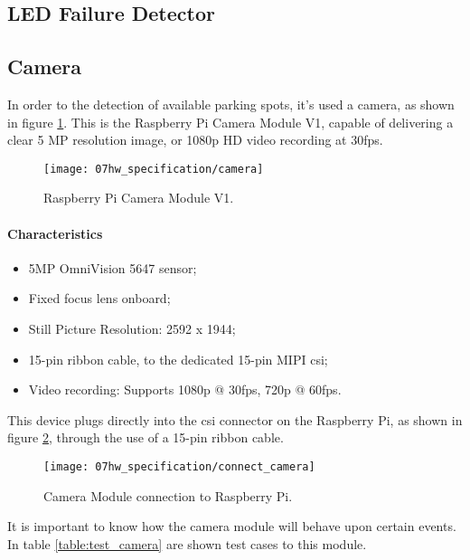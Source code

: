 \subsection{LED Failure Detector}

\subsection{Camera}
In order to the detection of available parking spots, it's used a camera, as shown in figure \ref{fig:camera}. This is the Raspberry Pi Camera Module V1, capable of delivering a clear 5 MP resolution image, or 1080p HD video recording at 30fps. \cite{camera}

\begin{figure}[H]
	\centering
	\texttt{[image: 07hw\_specification/camera]}
	\caption{Raspberry Pi Camera Module V1.}
	\label{fig:camera}
\end{figure}

\paragraph*{Characteristics}
\begin{itemize}
	\item 5MP OmniVision 5647 sensor;
	\item Fixed focus lens onboard;
	\item Still Picture Resolution: 2592 x 1944;
	\item 15-pin ribbon cable, to the dedicated 15-pin MIPI \ac{csi};
	\item Video recording: Supports 1080p @ 30fps, 720p @ 60fps.
\end{itemize}

\clearpage
{}
This device plugs directly into the \ac{csi} connector on the Raspberry Pi, as shown in figure \ref{fig:connect_camera}, through the use of a 15-pin ribbon cable.

\begin{figure}[ht]
	\centering
	\texttt{[image: 07hw\_specification/connect\_camera]}
	\caption{Camera Module connection to Raspberry Pi.}
	\label{fig:connect_camera}
\end{figure}

It is important to know how the camera module will behave upon certain events. In table \ref{table:test_camera} are shown test cases to this module.

